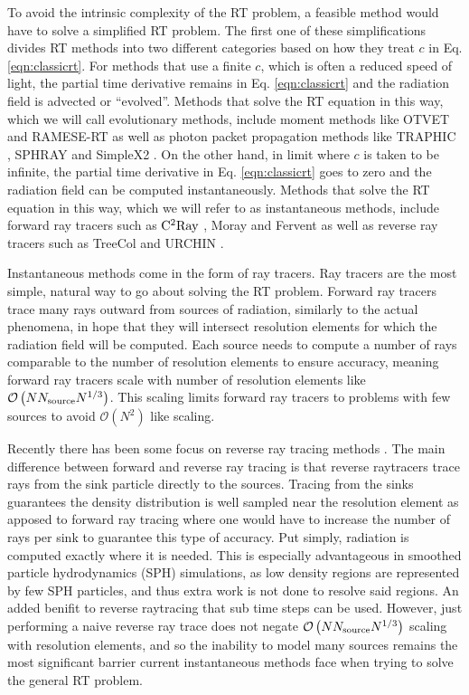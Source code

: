 \documentclass[fleq,usenatbib]{mnras}
\newcommand{\bigO}[1]{\mathcal{O}\left(#1\right)}
\newcommand{\NS}{N_{\rm source}}
\begin{document}
To avoid the intrinsic complexity of the RT problem, a feasible method would 
have to solve a simplified RT problem. The first one of these simplifications 
divides RT methods into two different categories based on how they treat $c$ 
in Eq. \ref{eqn:classicrt}. For methods that use a finite $c$, which is 
often a reduced speed of light, the partial time derivative remains in 
Eq. \ref{eqn:classicrt} and the radiation field is advected or 
``evolved''. Methods that solve the RT equation in this way, which we will 
call evolutionary methods, include moment methods like OTVET 
\citep{gnedinAbel01} and  RAMESE-RT \citep{rosdahlTeyssier15} as well as 
photon packet propagation methods like TRAPHIC \citep{pawlikSchaye08}, SPHRAY 
\citep{altayEt08} and SimpleX2 \citep{paardekooperEt10}. On the other hand, in 
limit where $c$ is taken to be infinite, the partial time derivative in 
Eq. \ref{eqn:classicrt} goes to zero and the radiation field can be 
computed instantaneously. Methods that solve the RT equation in this way, 
which we will refer to as instantaneous methods, include forward ray tracers 
such as $\rm C^2Ray$ \citep{mellemaEt06a}, Moray \citep{wiseAbel11} and 
Fervent \citep{baczynskiEt15} as well as reverse ray tracers such as TreeCol 
\citep{clarkEt12} and URCHIN \citep{altayTheuns13}. 

Instantaneous methods come in the form of ray tracers. Ray tracers are the most
 simple, natural way to go about solving the RT problem. Forward ray tracers 
trace many rays outward from sources of radiation, similarly to the actual 
phenomena, in hope that they will intersect resolution elements for which the 
radiation field will be computed. Each source needs to compute a number of rays
 comparable to the number of resolution elements to ensure accuracy, 
meaning forward ray tracers scale with number of resolution elements like 
$\bigO{N \NS N^{1/3}}$. This scaling limits forward ray 
tracers to problems with few sources to avoid $\mathcal{O}(N^2)$ like scaling. 

Recently there has been some focus on reverse ray tracing methods 
\citep{clarkEt12, altayTheuns13}. The main difference between forward and 
reverse ray tracing is that reverse raytracers trace rays from the sink 
particle directly to the sources. Tracing from the sinks guarantees the 
density distribution is well sampled near the resolution element as apposed to 
forward ray tracing where one would have to increase the number of rays per 
sink to guarantee this type of accuracy. Put simply, radiation is computed 
exactly where it is needed. This is especially advantageous in smoothed 
particle hydrodynamics (SPH) simulations, as low density regions are 
represented by few SPH particles, and thus extra work is not done to resolve 
said regions. An added benifit to reverse raytracing that sub time steps can 
be used. However, just performing a naive reverse ray trace does not negate 
$\bigO{N \NS N^{1/3}}$ scaling with resolution elements, and so the inability 
to model many sources remains the most significant barrier current 
instantaneous methods face when trying to solve the general RT problem.
\end{document}

